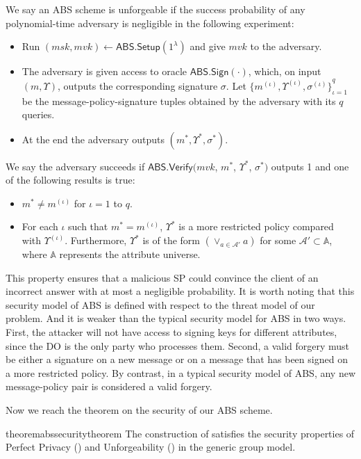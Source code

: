 \begin{definition}[Unforgeability]\label{def:access-control:abs-unf}
  We say an ABS scheme is unforgeable if the success probability of any polynomial-time adversary is negligible in the following experiment:
  \begin{itemize}
    \item Run $(msk, mvk) \gets \textsf{ABS.Setup}(1^\lambda)$ and give $mvk$ to the adversary.
    \item The adversary is given access to oracle $\textsf{ABS.Sign}(\cdot)$, which, on input $(m, \Upsilon)$, outputs the corresponding signature $\sigma$.
      Let ${\{m^{(\iota)}, \Upsilon^{(\iota)}, \sigma^{(\iota)}\}}_{\iota=1}^q$ be the message-policy-signature tuples obtained by the adversary with its $q$ queries.
    \item At the end the adversary outputs $(m^*, \Upsilon^*, \sigma^*)$.
  \end{itemize}
  We say the adversary succeeds if $\textsf{ABS.Verify}(mvk$, $m^*$, $\Upsilon^*$, $\sigma^*)$ outputs 1 and one of the following results is true:
  \begin{itemize}
    \item $m^\ast \neq m^{(\iota)}$ for $\iota=1$ to $q$.
    \item For each $\iota$ such that $m^\ast = m^{(\iota)}$, $\Upsilon^\ast$ is a more restricted policy compared with $\Upsilon^{(\iota)}$. Furthermore, $\Upsilon^\ast$ is of the form
      $(\lor_{a \in \mathcal{A}'} a)$ for some $\mathcal{A'} \subset \mathbb{A}$, where $\mathbb{A}$ represents the attribute universe.
  \end{itemize}
\end{definition}
This property ensures that a malicious SP could convince the client of an incorrect answer with at most a negligible probability.
It is worth noting that this security model of ABS is defined with respect to the threat model of our problem. And it is weaker than the typical security model for ABS in two ways. First, the attacker will not have access to signing keys for different attributes, since the DO is the only party who processes them. Second, a valid forgery must be either a signature on a new message or on a message that has been signed on a more restricted policy. By contrast, in a typical security model of ABS, any new message-policy pair is considered a valid forgery.

Now we reach the theorem on the security of our ABS scheme.

\begin{restatable}{theorem}{abssecuritytheorem}\label{thm:access-control:abs-sec}
  The construction of  satisfies the security properties of Perfect Privacy () and Unforgeability () in the generic group model.
\end{restatable}

